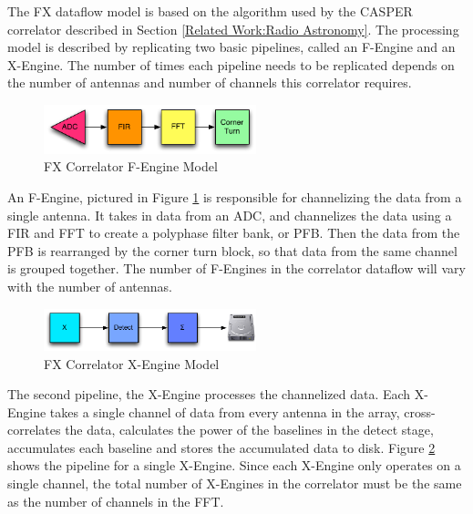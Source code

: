 The FX dataflow model is based on the algorithm used by the CASPER correlator described in Section \ref{Related Work:Radio Astronomy}. The processing model is described by replicating two basic pipelines, called an F-Engine and an X-Engine. The number of times each pipeline needs to be replicated depends on the number of antennas and number of channels this correlator requires.

\begin{figure}[h!]
  \centering
    \includegraphics[width=0.55\textwidth]{Images/C4/fx_f_engine.pdf}
  \caption{FX Correlator F-Engine Model}
  \label{fig: C4/fx_f_engine.pdf}
\end{figure}

An F-Engine, pictured in Figure \ref{fig: C4/fx_f_engine.pdf} is responsible for channelizing the data from a single antenna. 
It takes in data from an ADC, and channelizes the data using a FIR and FFT to create a polyphase filter bank, or PFB. 
Then the data from the PFB is rearranged by the corner turn block, so that data from the same channel is grouped together.
The number of F-Engines in the correlator dataflow will vary with the number of antennas.

\begin{figure}[h!]
  \centering
    \includegraphics[width=0.55\textwidth]{Images/C4/fx_x_engine.pdf}
  \caption{FX Correlator X-Engine Model}
  \label{fig: C4/fx_x_engine.pdf}
\end{figure}

The second pipeline, the X-Engine processes the channelized data. 
Each X-Engine takes a single channel of data from every antenna in the array, cross-correlates the data, calculates the power of the baselines in the detect stage, accumulates each baseline and stores the accumulated data to disk. 
Figure \ref{fig: C4/fx_x_engine.pdf} shows the pipeline for a single X-Engine. 
Since each X-Engine only operates on a single channel, the total number of X-Engines in the correlator must be the same as the number of channels in the FFT.


